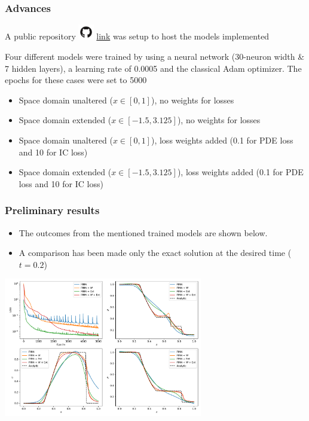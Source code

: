 \documentclass[aspectratio=169]{beamer}
\begin{document}
\begin{frame}\frametitle{Advances}
	
	A public repository \includegraphics[width=0.05\textwidth]{Figures/github_logo.png} \alert{\href{https://github.com/dalexa10/Machine_Learning/tree/main/5_Scientific_Machine_Learning/5_PINNs_Euler_Equations}{link}} was setup to host the models implemented
	
	\vspace{3mm}
	
	Four different models were trained by using a neural network (30-neuron width \& 7 hidden layers), a learning rate of 0.0005
	and the classical Adam optimizer. The epochs for these cases were set to 5000
		
	\begin{itemize}
		\item Space domain unaltered ($x \in [0, 1]$), no weights for losses
		\item Space domain extended ($x \in [-1.5, 3.125]$), no weights for losses
		\item Space domain unaltered ($x \in [0, 1]$), loss weights added (0.1 for PDE loss and 10 for IC loss)
		\item Space domain extended ($x \in [-1.5, 3.125]$), loss weights added (0.1 for PDE loss and 10 for IC loss)
	\end{itemize}
	

	
\end{frame}


\begin{frame}\frametitle{Preliminary results}
	\begin{itemize}
		\item The outcomes from the mentioned trained models are shown below.
		\item A comparison has been made only the exact solution at the desired time ($t=0.2$)
	\end{itemize}
	
	\begin{center}
		\includegraphics[width=0.65\textwidth]{Figures/preliminary_results.pdf}
	\end{center}
\end{frame}
\end{document}
